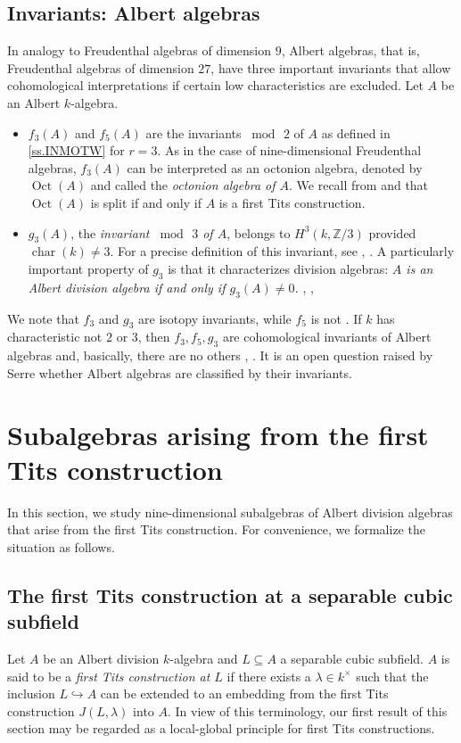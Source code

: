 \documentclass{amsart}
\theoremstyle{definition} %
\theoremstyle{remark} %
\newcommand{\ZZ}{\mathbb{Z}}
\newcommand{\IZ}{\ZZ}
\DeclareMathOperator{\Oct}{Oct}
\DeclareMathOperator{\ch}{char}
\renewcommand{\:}{\colon\,}
\numberwithin{equation}{section}
\begin{document}
\subsection{Invariants: Albert algebras} \label{ss.INVALB} In analogy to Freudenthal algebras of dimension $9$, Albert algebras, that is, Freudenthal algebras of dimension $27$, have three important invariants that allow  cohomological interpretations if certain low characteristics are excluded. Let $A$ be an Albert $k$-algebra.
\begin{itemize}
\item  $f_3(A)$ and $f_5(A)$ are the invariants $\bmod\,2$ of $A$ as defined in \ref{ss.INMOTW} for $r = 3$. As in the case of nine-dimensional Freudenthal algebras, $f_3(A)$ can be interpreted as an octonion algebra, denoted by $\Oct(A)$ and called the \emph{octonion algebra of $A$}. We recall from \cite[Prop.~(40.5)]{MR1632779} and \cite[Thm.~4.10]{MR2063796} that $\Oct(A)$ is split if and only if $A$ is a first Tits construction.

\item $g_3(A)$, the \emph{invariant $\bmod\,3$ of $A$}, belongs to $H^3(k,\IZ/3)$ provided $\ch(k) \ne 3$. For a precise definition of this invariant, see \cite[p.~537]{MR1632779}, \cite{MR99j:17045,PR:char3}. A particularly important property of $g_3$ is that it characterizes division algebras: \emph{$A$ is an Albert division algebra if and only if $g_3(A) \ne 0$.} \cite[Thm.~40.8]{MR1632779}, \cite[Thm.~3.2]{MR99j:17045}, \cite[Thm.~7]{PR:char3}
\end{itemize}
We note that $f_3$ and $g_3$ are isotopy invariants, while $f_5$ is not \cite[Cor.~60]{MR3916096}. If $k$ has characteristic not $2$ or $3$, then $f_3,f_5,g_3$ are cohomological invariants of Albert algebras and, basically, there are no others \cite[Prop.~8.6]{G:lens}, \cite[Thm.~22.5]{GMS}. It is an open question raised by Serre \cite{MR1321649} whether Albert algebras are classified by their invariants.




\section{Subalgebras arising from the first Tits construction} \label{s.SUFITI} In this section, we study nine-dimensional subalgebras of Albert division algebras that arise from the first Tits construction. For convenience, we formalize the situation as follows.

\subsection{The first Tits construction at a separable cubic subfield} \label{ss.FITSEP} Let $A$ be an Albert division $k$-algebra and $L \subseteq A$ a separable cubic subfield. $A$ is said to be a \emph{first Tits construction at $L$} if there exists a $\lambda \in k^\times$ such that the inclusion $L \hookrightarrow A$ can be extended to an embedding from the first Tits construction $J(L,\lambda)$ into $A$. In view of this terminology, our first result of this section may be regarded as a local-global principle for first Tits constructions.
\end{document}

